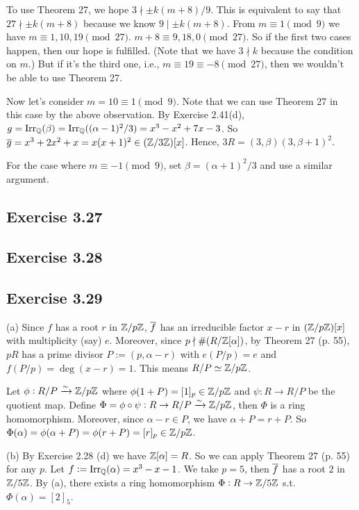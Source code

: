 \documentclass[../Marcus.tex]{subfiles}
\begin{document}
To use Theorem 27, we hope $3\nmid \pm k(m+8)/9$. This is equivalent to say that $27\nmid \pm k(m+8)$ because we know $9\mid \pm k(m+8)$. From $m\equiv 1 \pmod{9}$ we have $m\equiv 1,10,19 \pmod{27}$. $m+8\equiv 9,18,0 \pmod{27}$. So if the first two cases happen, then our hope is fulfilled. (Note that we have $3\nmid k$ because the condition on $m$.) But if it's the third one, i.e., $m\equiv 19\equiv -8 \pmod{27}$, then we wouldn't be able to use Theorem 27.

Now let's consider $m=10\equiv 1\pmod{9}$. Note that we can use Theorem 27 in this case by the above observation. By Exercise 2.41(d), $g=\operatorname{Irr}_{\mathbb{Q}}(\beta)=\operatorname{Irr}_{\mathbb{Q}}((\alpha-1)^2/3)=x^3-x^2+7x-3$. So $\overline{g}=x^3+2x^2+x=x(x+1)^2\in(\mathbb{Z}/3\mathbb{Z})[x]$. Hence, $3R=(3,\beta)(3,\beta+1)^2$.

For the case where $m\equiv -1\pmod{9}$, set $\beta=(\alpha+1)^2/3$ and use a similar argument.

\subsection*{Exercise 3.27}

\subsection*{Exercise 3.28}

\subsection*{Exercise 3.29}

(a) Since $f$ has a root $r$ in $\mathbb{Z}/p\mathbb{Z}$, $\overline{f}$ has an irreducible factor $x-r$ in $(\mathbb{Z}/p\mathbb{Z})[x]$ with multiplicity (say) $e$. Moreover, since $p\nmid \#(R/\mathbb{Z}[\alpha])$, by Theorem 27 (p. 55), $pR$ has a prime divisor $P:=(p,\alpha-r)$ with $e(P/p)=e$ and $f(P/p)=\deg(x-r)=1$. This means $R/P\simeq \mathbb{Z}/p\mathbb{Z}$.

Let $\phi:R/P\xrightarrow{\sim}\mathbb{Z}/p\mathbb{Z}$ where $\phi(1+P)=[1]_p\in\mathbb{Z}/p\mathbb{Z}$ and $\psi:R\to R/P$ be the quotient map. Define $\Phi=\phi\circ\psi:R\to R/P\xrightarrow{\sim}\mathbb{Z}/p\mathbb{Z}$, then $\Phi$ is a ring homomorphism. Moreover, since $\alpha-r\in P$, we have $\alpha+P=r+P$. So $\Phi(\alpha)=\phi(\alpha+P)=\phi(r+P)=[r]_p\in\mathbb{Z}/p\mathbb{Z}$.

(b) By Exercise 2.28 (d) we have $\mathbb{Z}[\alpha]=R$. So we can apply Theorem 27 (p. 55) for any $p$. Let $f:=\operatorname{Irr}_{\mathbb{Q}}(\alpha)=x^3-x-1$. We take $p=5$, then $\overline{f}$ has a root $2$ in $\mathbb{Z}/5\mathbb{Z}$. By (a), there exists a ring homomorphism $\Phi:R\to\mathbb{Z}/5\mathbb{Z}$ s.t. $\Phi(\alpha)=[2]_5$.
\end{document}
